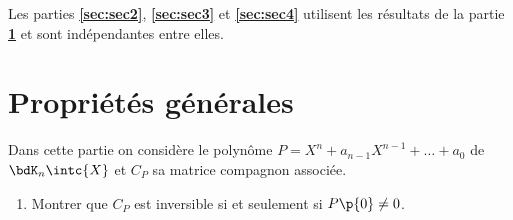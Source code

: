 \documentclass[a4paper,french,bookmarks]{article}
\begin{document}
    Les parties \textbf{\sffamily \ref{sec:sec2}}, \textbf{\sffamily \ref{sec:sec3}} et \textbf{\sffamily \ref{sec:sec4}} utilisent les résultats de la partie \textbf{\sffamily \ref{sec:sec1}} et sont indépendantes entre elles.
    
    \section{Propriétés générales}\label{sec:sec1}
    
    Dans cette partie on considère le polynôme $P = X^n + a_{n-1}X^{n-1} + \dots + a_0$ de $\bdK_n\intc{X}$ et $C_P$ sa matrice compagnon associée.
    
    \begin{enumerate}
        \item Montrer que $C_P$ est inversible si et seulement si $P\p{0} \neq 0$.
        

\end{enumerate}
\end{document}
